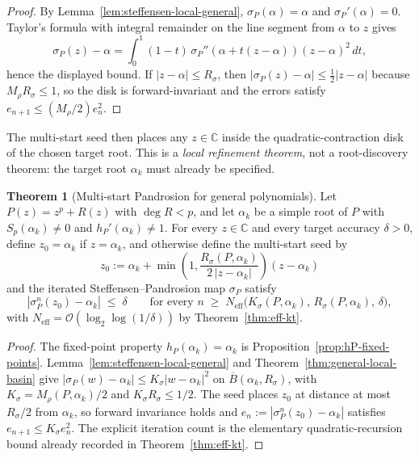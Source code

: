 \documentclass[11pt,a4paper]{article}
\theoremstyle{definition}
\newtheorem{theorem}{Theorem}[section]
\begin{document}
\begin{proof}
By Lemma~\ref{lem:steffensen-local-general}, $\sigma_P(\alpha)=\alpha$ and
$\sigma_P'(\alpha)=0$. Taylor's formula with integral remainder on the line
segment from $\alpha$ to $z$ gives
\[
  \sigma_P(z)-\alpha
  =
  \int_0^1 (1-t)\,\sigma_P''(\alpha+t(z-\alpha))(z-\alpha)^2\,dt,
\]
hence the displayed bound. If $|z-\alpha|\le R_\sigma$, then
$|\sigma_P(z)-\alpha|\le \frac12 |z-\alpha|$ because
$M_\rho R_\sigma\le1$, so the disk is forward-invariant and the errors satisfy
$e_{n+1}\le (M_\rho/2)e_n^2$.
\end{proof}

The multi-start seed then places any $z \in \mathbb{C}$ inside the quadratic-contraction disk of the chosen target root. This is a \emph{local refinement theorem}, not a root-discovery theorem: the target root $\alpha_k$ must already be specified.

\begin{theorem}[Multi-start Pandrosion for general polynomials]\label{thm:multistart-general}
Let $P(z) = z^p + R(z)$ with $\deg R < p$, and let $\alpha_k$ be a simple root of $P$ with $S_p(\alpha_k) \neq 0$ and $h_P'(\alpha_k) \neq 1$. For every $z \in \mathbb{C}$ and every target accuracy $\delta > 0$, define $z_0=\alpha_k$ if $z=\alpha_k$, and otherwise define the multi-start seed by
\[
  z_0 := \alpha_k + \min\!\left(1,\frac{R_\sigma(P, \alpha_k)}{2\,|z - \alpha_k|}\right)(z - \alpha_k)
\]
and the iterated Steffensen--Pandrosion map $\sigma_P$ satisfy
\[
  |\sigma_P^n(z_0) - \alpha_k| \;\leq\; \delta
  \qquad \text{for every } n \;\geq\; N_{\mathrm{eff}}\bigl(K_\sigma(P, \alpha_k),\, R_\sigma(P, \alpha_k),\, \delta\bigr),
\]
with $N_{\mathrm{eff}} = \mathcal{O}(\log_2 \log(1/\delta))$ by Theorem~\ref{thm:eff-kt}.
\end{theorem}

\begin{proof}
The fixed-point property $h_P(\alpha_k)=\alpha_k$ is
Proposition~\ref{prop:hP-fixed-points}. Lemma~\ref{lem:steffensen-local-general}
and Theorem~\ref{thm:general-local-basin} give
$|\sigma_P(w)-\alpha_k|\le K_\sigma|w-\alpha_k|^2$ on
$\overline{B}(\alpha_k,R_\sigma)$, with
$K_\sigma=M_\rho(P,\alpha_k)/2$ and $K_\sigma R_\sigma\le1/2$. The seed places
$z_0$ at distance at most $R_\sigma/2$ from $\alpha_k$, so forward invariance
holds and $e_n:=|\sigma_P^n(z_0)-\alpha_k|$ satisfies
$e_{n+1}\le K_\sigma e_n^2$. The explicit iteration count is the elementary
quadratic-recursion bound already recorded in Theorem~\ref{thm:eff-kt}.
\end{proof}
\end{document}
